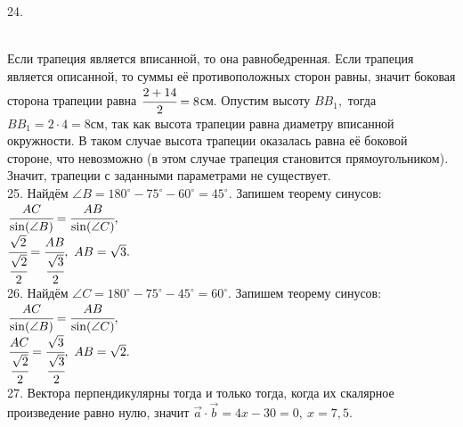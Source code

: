 \documentclass[12pt]{article}
\begin{document}
24. \begin{figure}[ht!]
\end{figure}\\
Если трапеция является вписанной, то она равнобедренная. Если трапеция является описанной, то суммы её противоположных сторон равны, значит боковая сторона трапеции равна $\cfrac{2+14}{2}=8$см. Опустим высоту $BB_1,$ тогда $BB_1=2\cdot4=8$см, так как высота трапеции равна диаметру вписанной окружности. В таком случае высота трапеции оказалась равна её боковой стороне, что невозможно (в этом случае трапеция становится прямоугольником). Значит, трапеции с заданными параметрами не существует.\\
25. Найдём $\angle B=180^\circ-75^\circ-60^\circ=45^\circ.$ Запишем теорему синусов: $\cfrac{AC}{\sin(\angle B)}=\cfrac{AB}{\sin(\angle C)},$\\$
\cfrac{\sqrt{2}}{\cfrac{\sqrt{2}}{2}}=\cfrac{AB}{\cfrac{\sqrt{3}}{2}},\ AB=\sqrt{3}.$\\
26. Найдём $\angle C=180^\circ-75^\circ-45^\circ=60^\circ.$ Запишем теорему синусов: $\cfrac{AC}{\sin(\angle B)}=\cfrac{AB}{\sin(\angle C)},$\\$
\cfrac{AC}{\cfrac{\sqrt{2}}{2}}=\cfrac{\sqrt{3}}{\cfrac{\sqrt{3}}{2}},\ AB=\sqrt{2}.$\\
27. Вектора перпендикулярны тогда и только тогда, когда их скалярное произведение равно нулю, значит $\vec{a}\cdot\vec{b}=4x-30=0,\ x=7,5.$\\
\end{document}

